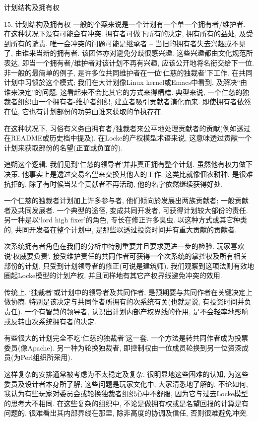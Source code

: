 \documentclass[a4paper,12pt,UTF8,twoside]{ctexbook}
\begin{document}
计划结构及拥有权

15. 计划结构及拥有权
一般的个案来说是一个计划有一个单一个拥有者/维护者. 在这种状况下没有可能会有冲突. 拥有者可做下所有的决定, 拥有所有的益处, 及受到所有的谴责. 唯一会冲突的问题可能是继承者 -- 当旧的拥有者失去兴趣或不见了, 由谁来当新的拥有者. 该团体亦对避免分歧很感兴趣. 这些兴趣都由文化规范所表达, 即当一个拥有者/维护者对该计划不再有兴趣, 应该公开地将名衔交给下一位.
非一般的最简单的例子, 是许多位共同维护者在一位`仁慈的独裁者'下工作. 在共同计划中习惯於这个模式; 我们在大计划像Linux kernel或Emacs中看到, 及解决``由谁来决定''的问题, 这看起来不会比其它的方式来得糟糕.
典型来说, 一个仁慈的独裁者组织由一个拥有者-维护者组织, 建立者吸引贡献者演化而来. 即使拥有者依然在位, 它也有计划部份的功劳由谁来获取的争执存在.

在这种状况下, 习俗有义务由拥有者/独裁者来公平地处理贡献者的贡献(例如透过在README或历史档中提及). 在Locke的产权模型术语来说, 这意味透过贡献一个计划来获取部份的名望(正面或负面的).

追朔这个逻辑, 我们见到`仁慈的领导者'并非真正拥有整个计划. 虽然他有权力做下决策, 他事实上是透过交易名望来交换其他人的工作. 这类比就像佃农耕种, 是很难抗拒的, 除了有时候当某个贡献者不再活动, 他的名字依然继续获得好处.

一个仁慈的独裁者计划加上许多参与者, 他们倾向於发展出两族贡献者; 一般贡献者及共同发展者. 一个典型的途径, 变成共同开发者, 可获得计划较大部份的责任. 另一种是以`lord high fixer'的角色, 专长在修正许多臭虫. 以这种方式或其它种类的, 共同开发者在整个计划中, 是那些以透过投资时间并有重大贡献的贡献者.

次系统拥有者角色在我们的分析中特别重要并且要求更进一步的检验. 玩家喜欢说`权威要负责'. 接受维护责任的共同作者可获得一个次系统的掌控权及所有相关部份的计划, 只受到计划领导者的修正(可说是建筑师). 我们观察到这项法则有效地圈起Locke模型的计划产权, 并且同样地有其它产权界线避免冲突的效用.

传统上, `独裁者'或计划中的领导者及共同作者, 是预期要与共同作者在关键决定上做协商. 特别是该决定与共同作者所拥有的次系统有关(也就是说, 有投资时间并负责任). 一个有智慧的领导者, 认识出计划内部产权界线的作用, 是不会轻率地影响或反转由次系统拥有者的决定.

有些很大的计划完全不吃`仁慈的独裁者'这一套. 一个方法是转共同作者成为投票委员(像Apache). 另一种为轮换独裁者, 即控制权由一位成员轮换到另一位资深成员(为Perl组织所采用).

这样复杂的安排通常被考虑为不太稳定及复杂. 很明显地这些困难的认知, 为这些委员及设计者本身所了解; 这些问题是玩家文化中, 大家清悉地了解的.  不论如何, 我认为有些玩家对委员会或轮换独裁者组织心中不舒服, 因为它与过去Locke模型的思考大不相同. 在这些复杂的组织中, 不论是做拥有权或是名望回报的计算是有问题的. 很难看出其内部界线在那里, 除非高度的协调及信任, 否则很难避免冲突.
\end{document}
